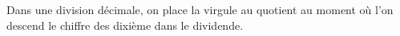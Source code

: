 Dans une division décimale, on place la virgule au quotient au moment où l'on
descend le chiffre des dixième dans le dividende.